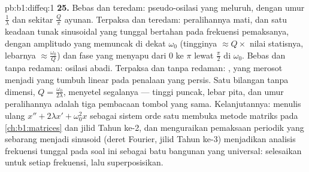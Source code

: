\begin{solution}{pb:b1:diffeq:1}
\textbf{25.} Bebas dan teredam: pseudo-osilasi yang meluruh,
dengan umur $\frac1\lambda$ dan sekitar $\frac Q\pi$ ayunan. Terpaksa dan
teredam: peralihannya mati, dan satu keadaan tunak sinusoidal yang tunggal
bertahan pada frekuensi pemaksanya, dengan amplitudo yang memuncak di dekat
$\omega_0$ (tingginya $\approx Q \times$ nilai statisnya, lebarnya $\approx
\frac{\omega_0}Q$) dan fase yang menyapu dari $0$ ke $\pi$ lewat
$\frac\pi2$ di $\omega_0$. Bebas dan tanpa redaman: osilasi
abadi. Terpaksa dan tanpa redaman: , yang merosot menjadi
 yang tumbuh linear pada penalaan yang persis. Satu bilangan
tanpa dimensi, $Q = \frac{\omega_0}{2\lambda}$, menyetel segalanya ---
tinggi puncak, lebar pita, dan umur peralihannya adalah tiga pembacaan
tombol yang sama. Kelanjutannya: menulis ulang $x'' + 2\lambda x' +
\omega_0^2x$ sebagai sistem orde satu membuka metode matriks pada
\cref{ch:b1:matrices} dan jilid Tahun ke-2, dan menguraikan
pemaksaan periodik yang sebarang menjadi sinusoid (deret Fourier, jilid
Tahun ke-3) menjadikan analisis frekuensi tunggal pada soal ini sebagai
batu bangunan yang universal: selesaikan untuk setiap frekuensi, lalu
superposisikan.

\end{solution}
